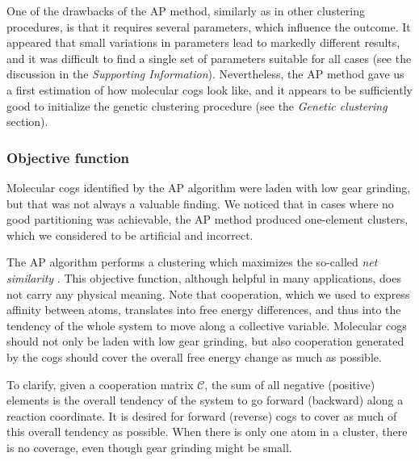 One of the drawbacks of the AP method, similarly as in other clustering procedures, is that it requires several parameters, which influence the outcome.
It appeared that small variations in parameters lead to markedly different results, and it was difficult to find a single set of parameters suitable for all cases (see the discussion in the \emph{Supporting Information}).
Nevertheless, the AP method gave us a first estimation of how molecular cogs look like, and it appears to be sufficiently good to initialize the genetic clustering procedure (see the \emph{Genetic clustering} section).

\subsubsection*{Objective function}\label{sec:objective}
Molecular cogs identified by the AP algorithm were laden with low gear grinding, but that was not always a valuable finding. 
We noticed that in cases where no good partitioning was achievable, the AP method produced one-element clusters, which we considered to be artificial and incorrect. 

The AP algorithm performs a clustering which maximizes the so-called \emph{net similarity} \cite{frey2007clustering}.
This objective function, although helpful in many applications, does not carry any physical meaning.
Note that cooperation, which we used to express affinity between atoms, translates into free energy differences, and thus into the tendency of the whole system to move along a collective variable.
Molecular cogs should not only be laden with low gear grinding, but also cooperation generated by the cogs should cover the overall free energy change as {\color{black}much} as possible.

To clarify, given a cooperation matrix $\mathcal{C}$, the sum of all negative (positive) elements is the overall tendency of the system to go forward (backward) along a reaction coordinate.
It is desired for forward (reverse) cogs to cover as much of this overall tendency as possible.
When there is only one atom in a cluster, there is no coverage, even though gear grinding might be small.

